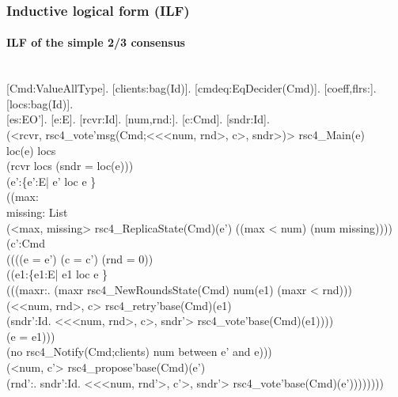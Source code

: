 \documentclass[12pt,red]{beamer}
\renewcommand{\mdownarrow}[1]{}
\begin{document}
\begin{frame}[fragile]
  \frametitle{Inductive logical form (ILF)}

  \framesubtitle{ILF of the simple 2/3 consensus}

  \begin{tiny}
\begin{program*}
\>\\
\>\mforall{}[Cmd:ValueAllType]. \mforall{}[clients:bag(Id)]. \mforall{}[cmdeq:EqDecider(Cmd)]. \mforall{}[coeff,flrs:\mBbbZ{}]. \mforall{}[locs:bag(Id)].\\
\>\mforall{}[es:EO']. \mforall{}[e:E]. \mforall{}[rcvr:Id]. \mforall{}[num,rnd:\mBbbZ{}]. \mforall{}[c:Cmd]. \mforall{}[sndr:Id].\\
\>  (<rcvr, rsc4\_vote'msg(Cmd;<<<num, rnd>, c>, sndr>)> \mmember{} rsc4\_Main(e)\\
\>  \mLeftarrow{}{}\mRightarrow{} loc(e) \mdownarrow{}\mmember{} locs\\
\>      \mwedge{} (rcvr \mdownarrow{}\mmember{} locs \mwedge{} (sndr = loc(e)))\\
\>      \mwedge{} (\mdownarrow{}\mexists{}e':\{e':E| e' \mleq{}loc e \} \\
\>           ((\mdownarrow{}\mexists{}max:\mBbbZ{}\\
\>               \mexists{}missing:\mBbbZ{} List\\
\>                (<max, missing> \mmember{} rsc4\_ReplicaState(Cmd)(e') \mwedge{} ((max < num) \mvee{} (num \mmember{} missing))))\\
\>           \mwedge{} (\mexists{}c':Cmd\\
\>               ((\mdownarrow{}((e = e') \mwedge{} (c = c') \mwedge{} (rnd = 0))\\
\>                  \mvee{} ((\mdownarrow{}\mexists{}e1:\{e1:E| e1 \mleq{}loc e \} \\
\>                        (((\mdownarrow{}\mexists{}maxr:\mBbbZ{}. (maxr \mmember{} rsc4\_NewRoundsState(Cmd) num(e1) \mwedge{} (maxr < rnd)))\\
\>                        \mwedge{} (<<num, rnd>, c> \mmember{} rsc4\_retry'base(Cmd)(e1)\\
\>                          \mdownarrow{}\mvee{} (\mexists{}sndr':Id. <<<num, rnd>, c>, sndr'> \mmember{} rsc4\_vote'base(Cmd)(e1))))\\
\>                        \mwedge{} (e = e1)))\\
\>                    \mwedge{} (no rsc4\_Notify(Cmd;clients) num between e' and e)))\\
\>               \mwedge{} (<num, c'> \mmember{} rsc4\_propose'base(Cmd)(e')\\
\>                 \mdownarrow{}\mvee{} (\mexists{}rnd':\mBbbZ{}. \mexists{}sndr':Id. <<<num, rnd'>, c'>, sndr'> \mmember{} rsc4\_vote'base(Cmd)(e'))))))))\\
\>
\end{program*}
  \end{tiny}
\end{frame}
\end{document}
